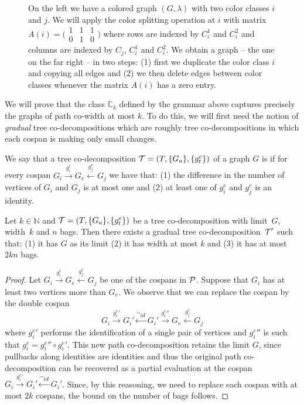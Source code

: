 \begin{figure}
    \centering
    \caption{On the left we have a colored graph $(G, \lambda)$ with two color classes $i$ and $j$. We will apply the color splitting operation at $i$ with matrix 
    \(
    A(i) = \bigl(\begin{smallmatrix}
    1 & 1 & 1 \\
    0 & 1 & 0
    \end{smallmatrix}\bigr)
    \)
    where rows are indexed by $C_i^1$ and $C_i^2$ and columns are indexed by $C_j$, $C_i^1$ and $C_i^2$. We obtain a graph -- the one on the far right -- in two steps: (1) first we duplicate the color class $i$ and copying all edges and (2) we then delete edges between color classes whenever the matrix $A(i)$ has a zero entry.}
    \label{fig:grammar}
\end{figure}

We will prove that the class $\mathbb{C}_k$ defined by the grammar above captures precisely the graphs of path co-width at most $k$. To do this, we will first need the notion of \textit{gradual} tree co-decompositions which are roughly tree co-decompositions in which each cospan is making only small changes. 

\begin{definition}\label{def: gradual tree co-decomp}
    We say that a tree co-decomposition $\operatorname{\mathcal{T}} = (T,\{G_a\},\{g_t^e\})$ of a graph $G$ is  if for every cospan $G_i \xrightarrow{g_i^e} G_e \xleftarrow{g_j^e} G_j$ we have that: (1) the difference in the number of vertices of $G_i$ and $G_j$ is at most one and (2) at least one of $g_i^e$ and $g_j^e$ is an identity.
\end{definition}

\begin{lemma}\label{lemm:helper}
    Let $k\in \mathbb{N}$ and $\operatorname{\mathcal{T}}=(T,\{G_a\},\{g_t^e\})$ be a tree co-decomposition with limit~$G$,  width~$k$ and $n$ bags. Then there exists a gradual tree co-decomposition~$\operatorname{\mathcal{T}}'$ such that: (1) it has $G$ as its limit (2) it has width at most $k$ and (3) it has at most $2kn$ bags. 
\end{lemma}
\begin{proof}
    Let $G_i\xrightarrow{g_i^e}G_e\xleftarrow{g_j^e} G_j$ be one of the cospans in $\operatorname{\mathcal{P}}$. Suppose that $G_i$ has at least two vertices more than $G_e$. We observe that we can replace the cospan by the double cospan
    \[
        G_i\xrightarrow{{g_i^e}'} G_i'\xleftarrow{\cat{id}} {G_i}'\xrightarrow{{g_i^e}''}G_e\xleftarrow{g_j^e}G_j
    \]
    where ${g_i^e}'$ performs the identification of a single pair of vertices and ${g_i^e}''$ is such that $g_i^e={g_i^e}''\circ {g_i^e}'$. This new path co-decomposition retains the limit $G$, since pullbacks along identities are identities and thus the original path co-decomposition can be recovered as a partial evaluation at the cospan $G_i\xrightarrow{{g_i^e}'} G_i'\xleftarrow{\cat{id}} G_i'$. Since, by this reasoning, we need to replace each cospan with at most $2k$ cospans, the bound on the number of bags follows.
\end{proof}

